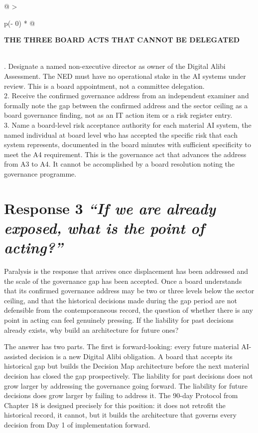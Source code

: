 \begin{longtable}[]{@{}
  >{\raggedright\arraybackslash}p{(\columnwidth - 0\tabcolsep) * }@{}}
\toprule\noalign{}
\begin{minipage}[b]{\linewidth}\raggedright
\textbf{THE THREE BOARD ACTS THAT CANNOT BE DELEGATED}
\end{minipage} \\
\midrule\noalign{}
\endhead
\bottomrule\noalign{}
. Designate a named non-executive director as owner of the Digital Alibi Assessment. The NED must have no operational stake in the AI systems under review. This is a board appointment, not a committee delegation. \\
2. Receive the confirmed governance address from an independent examiner and formally note the gap between the confirmed address and the sector ceiling as a board governance finding, not as an IT action item or a risk register entry. \\
3. Name a board-level risk acceptance authority for each material AI system, the named individual at board level who has accepted the specific risk that each system represents, documented in the board minutes with sufficient specificity to meet the A4 requirement. This is the governance act that advances the address from A3 to A4. It cannot be accomplished by a board resolution noting the governance programme. \\
\end{longtable}

\scenebreak

\section{\texorpdfstring{Response 3 \emph{``If we are already exposed, what is the point of acting?''}}{Response 3 ``If we are already exposed, what is the point of acting?''}}

Paralysis is the response that arrives once displacement has been addressed and the scale of the governance gap has been accepted. Once a board understands that its confirmed governance address may be two or three levels below the sector ceiling, and that the historical decisions made during the gap period are not defensible from the contemporaneous record, the question of whether there is any point in acting can feel genuinely pressing. If the liability for past decisions already exists, why build an architecture for future ones?

The answer has two parts. The first is forward-looking: every future material AI-assisted decision is a new Digital Alibi obligation. A board that accepts its historical gap but builds the Decision Map architecture before the next material decision has closed the gap prospectively. The liability for past decisions does not grow larger by addressing the governance going forward. The liability for future decisions does grow larger by failing to address it. The 90-day Protocol from Chapter 18 is designed precisely for this position: it does not retrofit the historical record, it cannot, but it builds the architecture that governs every decision from Day 1 of implementation forward.

